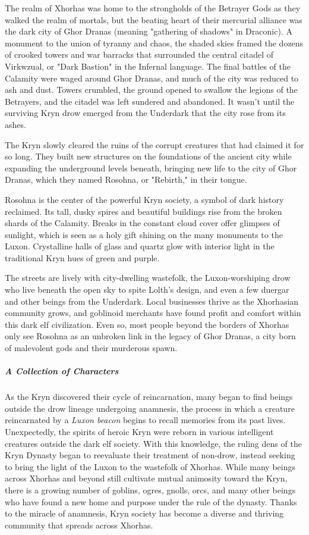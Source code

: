 \documentclass[10pt,a4paper,twoside,bg=print,twocolumn,openany,nodeprecatedcode]{dndbook}
\begin{document}
The realm of Xhorhas was home to the strongholds of the Betrayer Gods as they walked the realm of mortals, but the beating heart of their mercurial alliance was the dark city of Ghor Dranas (meaning "gathering of shadows" in Draconic). A monument to the union of tyranny and chaos, the shaded skies framed the dozens of crooked towers and war barracks that surrounded the central citadel of Virkwzual, or "Dark Bastion" in the Infernal language. The final battles of the Calamity were waged around Ghor Dranas, and much of the city was reduced to ash and dust. Towers crumbled, the ground opened to swallow the legions of the Betrayers, and the citadel was left sundered and abandoned. It wasn't until the surviving Kryn drow emerged from the Underdark that the city rose from its ashes.

The Kryn slowly cleared the ruins of the corrupt creatures that had claimed it for so long. They built new structures on the foundations of the ancient city while expanding the underground levels beneath, bringing new life to the city of Ghor Dranas, which they named Rosohna, or "Rebirth," in their tongue.

Rosohna is the center of the powerful Kryn society, a symbol of dark history reclaimed. Its tall, dusky spires and beautiful buildings rise from the broken shards of the Calamity. Breaks in the constant cloud cover offer glimpses of sunlight, which is seen as a holy gift shining on the many monuments to the Luxon. Crystalline halls of glass and quartz glow with interior light in the traditional Kryn hues of green and purple.

The streets are lively with city-dwelling wastefolk, the Luxon-worshiping drow who live beneath the open sky to spite Lolth's design, and even a few duergar and other beings from the Underdark. Local businesses thrive as the Xhorhasian community grows, and goblinoid merchants have found profit and comfort within this dark elf civilization. Even so, most people beyond the borders of Xhorhas only see Rosohna as an unbroken link in the legacy of Ghor Dranas, a city born of malevolent gods and their murderous spawn.

\subparagraph{A Collection of Characters}
As the Kryn discovered their cycle of reincarnation, many began to find beings outside the drow lineage undergoing anamnesis, the process in which a creature reincarnated by a \textit{Luxon beacon} begins to recall memories from its past lives. Unexpectedly, the spirits of heroic Kryn were reborn in various intelligent creatures outside the dark elf society. With this knowledge, the ruling dens of the Kryn Dynasty began to reevaluate their treatment of non-drow, instead seeking to bring the light of the Luxon to the wastefolk of Xhorhas. While many beings across Xhorhas and beyond still cultivate mutual animosity toward the Kryn, there is a growing number of goblins, ogres, gnolls, orcs, and many other beings who have found a new home and purpose under the rule of the dynasty. Thanks to the miracle of anamnesis, Kryn society has become a diverse and thriving community that spreads across Xhorhas.
\end{document}
